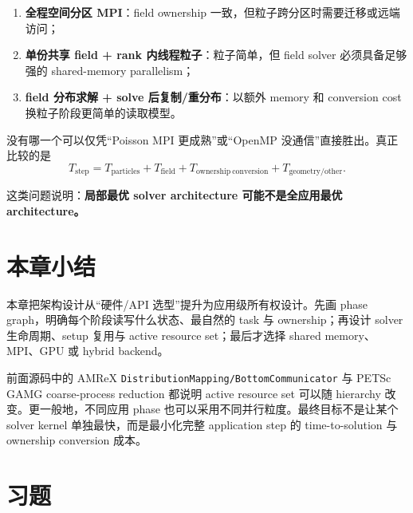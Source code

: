 \begin{enumerate}
\item \textbf{全程空间分区 MPI}：field ownership 一致，但粒子跨分区时需要迁移或远端访问；
\item \textbf{单份共享 field + rank 内线程粒子}：粒子简单，但 field solver 必须具备足够强的 shared-memory parallelism；
\item \textbf{field 分布求解 + solve 后复制/重分布}：以额外 memory 和 conversion cost 换粒子阶段更简单的读取模型。
\end{enumerate}

没有哪一个可以仅凭“Poisson MPI 更成熟”或“OpenMP 没通信”直接胜出。真正比较的是
\begin{equation}
T_{\mathrm{step}}
=
T_{\mathrm{particles}}
+
T_{\mathrm{field}}
+
T_{\mathrm{ownership\ conversion}}
+
T_{\mathrm{geometry/other}}.
\label{eq:architecture-coupled-step}
\end{equation}

这类问题说明：\textbf{局部最优 solver architecture 可能不是全应用最优 architecture。}

\section{本章小结}
本章把架构设计从“硬件/API 选型”提升为应用级所有权设计。先画 phase graph，明确每个阶段读写什么状态、最自然的 task 与 ownership；再设计 solver 生命周期、setup 复用与 active resource set；最后才选择 shared memory、MPI、GPU 或 hybrid backend。

前面源码中的 AMReX \texttt{DistributionMapping/BottomCommunicator} 与 PETSc GAMG coarse-process reduction 都说明 active resource set 可以随 hierarchy 改变。更一般地，不同应用 phase 也可以采用不同并行粒度。最终目标不是让某个 solver kernel 单独最快，而是最小化完整 application step 的 time-to-solution 与 ownership conversion 成本。

\section*{习题}

